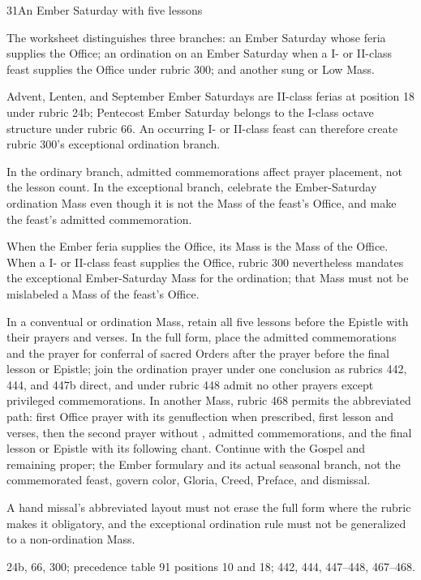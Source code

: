 \begin{casefile}{31}{An Ember Saturday with five lessons}
\item[Calendar facts] The worksheet distinguishes three branches: an Ember Saturday whose feria supplies the Office; an ordination on an Ember Saturday when a I- or II-class feast supplies the Office under rubric 300; and another sung or Low Mass.
\item[Ranks and rows] Advent, Lenten, and September Ember Saturdays are II-class ferias at position 18 under rubric 24b; Pentecost Ember Saturday belongs to the I-class octave structure under rubric 66.  An occurring I- or II-class feast can therefore create rubric 300's exceptional ordination branch.
\item[Impeded item] In the ordinary branch, admitted commemorations affect prayer placement, not the lesson count.  In the exceptional branch, celebrate the Ember-Saturday ordination Mass even though it is not the Mass of the feast's Office, and make the feast's admitted commemoration.
\item[Mass category] When the Ember feria supplies the Office, its Mass is the Mass of the Office.  When a I- or II-class feast supplies the Office, rubric 300 nevertheless mandates the exceptional Ember-Saturday Mass for the ordination; that Mass must not be mislabeled a Mass of the feast's Office.
\item[Assembly] In a conventual or ordination Mass, retain all five lessons before the Epistle with their prayers and verses.  In the full form, place the admitted commemorations and the prayer for conferral of sacred Orders after the prayer before the final lesson or Epistle; join the ordination prayer under one conclusion as rubrics 442, 444, and 447b direct, and under rubric 448 admit no other prayers except privileged commemorations.  In another Mass, rubric 468 permits the abbreviated path: first Office prayer with its genuflection when prescribed, first lesson and verses, then the second prayer without , admitted commemorations, and the final lesson or Epistle with its following chant.  Continue with the Gospel and remaining proper; the Ember formulary and its actual seasonal branch, not the commemorated feast, govern color, Gloria, Creed, Preface, and dismissal.
\item[Boundary] A hand missal's abbreviated layout must not erase the full form where the rubric makes it obligatory, and the exceptional ordination rule must not be generalized to a non-ordination Mass.
\item[Rubric locus] 24b, 66, 300; precedence table 91 positions 10 and 18; 442, 444, 447--448, 467--468.
\end{casefile}

